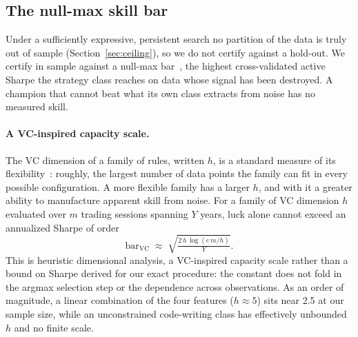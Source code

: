 \documentclass[11pt]{article}
\begin{document}
\subsection{The null-max skill bar}
\label{sec:bar}

Under a sufficiently expressive, persistent search no partition of the data is truly out of sample
(Section~\ref{sec:ceiling}), so we do not certify against a hold-out. We certify in sample against a
null-max bar~\cite{nullmax}, the highest cross-validated active Sharpe the strategy class reaches on
data whose signal has been destroyed. A champion that cannot beat what its own class extracts from
noise has no measured skill.

\paragraph{A VC-inspired capacity scale.} The VC dimension of a family of rules, written $h$, is a
standard measure of its flexibility~\cite{vapnik}: roughly, the largest number of data points the family
can fit in every possible configuration. A more flexible family has a larger $h$, and with it a greater
ability to manufacture apparent skill from noise. For a family of VC dimension $h$ evaluated over $m$
trading sessions spanning $Y$ years, luck alone cannot exceed an annualized Sharpe of order
\begin{equation}
\mathrm{bar}_{\mathrm{VC}} \;\approx\; \sqrt{\tfrac{2\,h\,\log(e\,m/h)}{Y}} .
\label{eq:vc}
\end{equation}
This is heuristic dimensional analysis, a VC-inspired capacity scale rather than a bound on Sharpe
derived for our exact procedure: the constant does not fold in the argmax selection step or the
dependence across observations. As an order of magnitude, a linear combination of the four features
($h\approx 5$) sits near 2.5 at our sample size, while an unconstrained code-writing class has
effectively unbounded $h$ and no finite scale.
\end{document}

